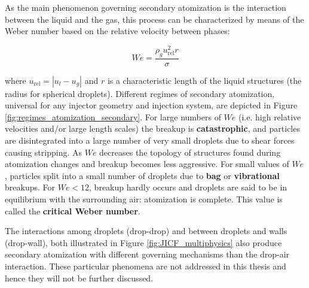 \begin{itemize}
	As the main phenomenon governing secondary atomization is the interaction between the liquid and the gas, this process can be characterized by means of the Weber number based on the relative velocity between phases:
	
	\begin{equation}
	We = \frac{\rho_g u_\mathrm{rel}^2 r}{\sigma} 
	\end{equation}
	
	where $u_\mathrm{rel} = | u_l - u_g  |$ and $r$ is a characteristic length of the liquid structures (the radius for spherical droplets). Different regimes of secondary atomization, universal for any injector geometry and injection system, are depicted in Figure \ref{fig:regimes_atomization_secondary}. For large numbers of $We$ (i.e. high relative velocities and/or large length scales) the breakup is \textbf{catastrophic}, and particles are disintegrated into a large number of very small droplets due to shear forces causing stripping. As $We$ decreases the topology of structures found during atomization changes and breakup becomes less aggressive. For small values of $We$, particles split into a small number of droplets due to \textbf{bag} or \textbf{vibrational} breakups. For $We < 12$, breakup hardly occurs and droplets are said to be in equilibrium with the surrounding air: atomization is complete. This value is called the \textbf{critical Weber number}. 
	
	The interactions among droplets (drop-drop) and between droplets and walls (drop-wall), both illustrated in Figure \ref{fig:JICF_multiphysics} also produce secondary atomization with different governing mechanisms than the drop-air interaction. These particular phenomena are not addressed in this thesis and hence they will not be further discussed.
	

\end{itemize}
